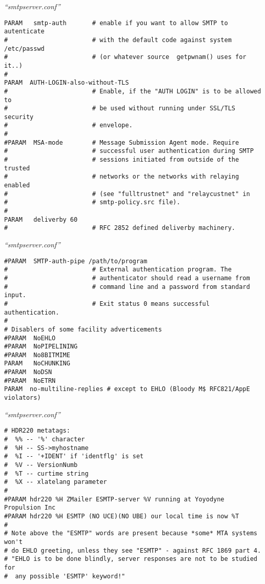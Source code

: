 \documentclass[a4paper,landscape]{slides}
\begin{document}
\begin{overlay}
\small
\centerline{{\it ``smtpserver.conf''}}
\tiny
\begin{verbatim}
PARAM   smtp-auth       # enable if you want to allow SMTP to autenticate
#                       # with the default code against system  /etc/passwd
#                       # (or whatever source  getpwnam() uses for it..)
#
PARAM  AUTH-LOGIN-also-without-TLS
#                       # Enable, if the "AUTH LOGIN" is to be allowed to
#                       # be used without running under SSL/TLS security
#                       # envelope.
#
#PARAM  MSA-mode        # Message Submission Agent mode. Require
#                       # successful user authentication during SMTP
#                       # sessions initiated from outside of the trusted
#                       # networks or the networks with relaying enabled
#                       # (see "fulltrustnet" and "relaycustnet" in
#                       # smtp-policy.src file).
#
PARAM   deliverby 60
#                       # RFC 2852 defined deliverby machinery.
\end{verbatim}
\end{overlay}
\begin{overlay}
\small
\centerline{{\it ``smtpserver.conf''}}
\tiny
\begin{verbatim}
#PARAM  SMTP-auth-pipe /path/to/program
#                       # External authentication program. The
#                       # authenticator should read a username from
#                       # command line and a password from standard input.
#                       # Exit status 0 means successful authentication.
#
# Disablers of some facility adverticements
#PARAM  NoEHLO
#PARAM  NoPIPELINING
#PARAM  No8BITMIME
PARAM   NoCHUNKING
#PARAM  NoDSN
#PARAM  NoETRN
PARAM  no-multiline-replies # except to EHLO (Bloody M$ RFC821/AppE violators)
\end{verbatim}
\end{overlay}
\begin{overlay}
\small
\centerline{{\it ``smtpserver.conf''}}
\tiny
\begin{verbatim}
# HDR220 metatags:
#  %% -- '%' character
#  %H -- SS->myhostname
#  %I -- '+IDENT' if 'identflg' is set
#  %V -- VersionNumb
#  %T -- curtime string
#  %X -- xlatelang parameter
#
#PARAM hdr220 %H ZMailer ESMTP-server %V running at Yoyodyne Propulsion Inc
#PARAM hdr220 %H ESMTP (NO UCE)(NO UBE) our local time is now %T
#
# Note above the "ESMTP" words are present because *some* MTA systems won't
# do EHLO greeting, unless they see "ESMTP" - against RFC 1869 part 4.
# "EHLO is to be done blindly, server responses are not to be studied for
#  any possible 'ESMTP' keyword!"
\end{verbatim}
\end{overlay}
\end{document}
